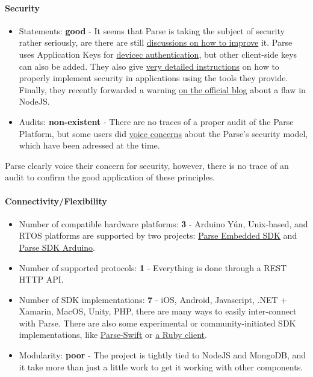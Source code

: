 \documentclass{article}
\begin{document}
\paragraph{Security}

\begin{itemize}
\item Statements: \textbf{good} - It seems that Parse is taking the subject of security rather seriously, are there are still \href{https://github.com/parse-community/parse-server/issues?utf8=\%E2\%9C\%93&q=is\%3Aissue\%20is\%3Aopen\%20security}{discussions on how to improve} it. Parse uses Application Keys for \href{http://docs.parseplatform.org/parse-server/guide/#using-parse-SDK-with-parse-server}{devicec authentication}, but other client-side keys can also be added. They also give \href{http://docs.parseplatform.org/rest/guide/#security}{very detailed instructions} on how to properly implement security in applications using the tools they provide. Finally, they recently forwarded a warning \href{http://blog.parseplatform.org/security/nodejs/update/notice/2017/07/20/nodejs-security-notice.html}{on the official blog} about a flaw in NodeJS.
\item Audits: \textbf{non-existent} - There are no traces of a proper audit of the Parse Platform, but some users did \href{https://groups.google.com/forum/#!topic/parse-developers/qjvKJYikHQ8}{voice concerns} about the Parse's security model, which have been adressed at the time.
\end{itemize}

Parse clearly voice their concern for security, however, there is no trace of an audit to confirm the good application of these principles.

\paragraph{Connectivity/Flexibility}

\begin{itemize}
\item Number of compatible hardware platforms: \textbf{3} - Arduino Yún, Unix-based, and RTOS platforms are supported by two projects: \href{https://github.com/parse-community/parse-embedded-SDK}{Parse Embedded SDK} and \href{https://github.com/parse-community/Parse-SDK-Arduino}{Parse SDK Arduino}.
\item Number of supported protocols: \textbf{1} - Everything is done through a REST HTTP API.
\item Number of SDK implementations: \textbf{7} - iOS, Android, Javascript, .NET + Xamarin, MacOS, Unity, PHP, there are many ways to easily inter-connect with Parse. There are also some experimental or community-initiated SDK implementations, like \href{https://github.com/parse-community/Parse-Swift}{Parse-Swift} or \href{https://github.com/modernistik/parse-stack}{a Ruby client}.
\item Modularity: \textbf{poor} - The project is tightly tied to NodeJS and MongoDB, and it take more than just a little work to get it working with other components.
\end{itemize}
\end{document}

